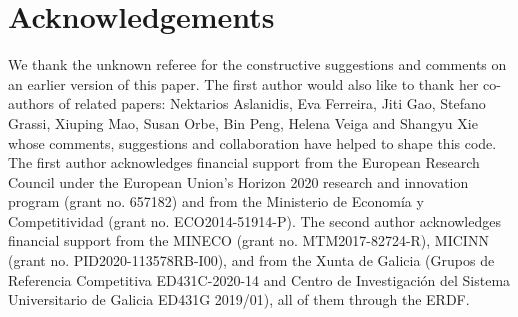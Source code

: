\section*{Acknowledgements}

We thank the unknown referee for the constructive suggestions and comments on an earlier version of this paper. The first author would also like to thank her co-authors of related papers: Nektarios Aslanidis, Eva Ferreira, Jiti Gao, Stefano Grassi, Xiuping Mao, Susan Orbe, Bin Peng, Helena Veiga and Shangyu Xie whose comments, suggestions and collaboration have helped to shape this code. The first author acknowledges financial support from the European Research Council under the European Union's Horizon 2020 research and innovation program (grant no. 657182) and from the Ministerio de Econom\'ia y Competitividad (grant no. ECO2014-51914-P). The second author acknowledges financial support from the MINECO (grant no. MTM2017-82724-R), MICINN (grant no. PID2020-113578RB-I00), and from the Xunta de Galicia (Grupos de Referencia Competitiva ED431C-2020-14 and Centro de Investigaci\'on del Sistema Universitario de Galicia ED431G 2019/01), all of them through the ERDF.



%
\address{Isabel Casas\\
  Department of Economics and Finance\\
  University of Deusto\\
  Spain\\
  ORCID: 0000-0002-9063-9670\\
  }

\address{Rub\'{e}n Fern\'andez-Casal\\
  Department of Mathematics\\
  University of A Coru\~{n}a\\
  Spain\\
  ORCID: 0000-0002-5785-3739\\
  }

